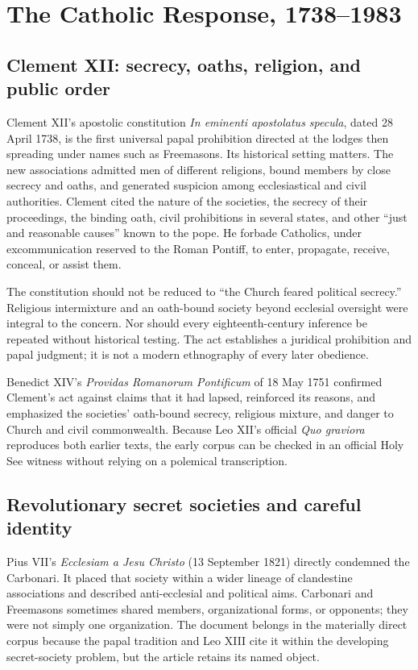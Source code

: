 \section{The Catholic Response, 1738--1983}

\subsection{Clement XII: secrecy, oaths, religion, and public order}

Clement XII's apostolic constitution \emph{In eminenti apostolatus specula}, dated 28 April 1738, is the first universal papal prohibition directed at the lodges then spreading under names such as Freemasons. Its historical setting matters. The new associations admitted men of different religions, bound members by close secrecy and oaths, and generated suspicion among ecclesiastical and civil authorities. Clement cited the nature of the societies, the secrecy of their proceedings, the binding oath, civil prohibitions in several states, and other “just and reasonable causes” known to the pope. He forbade Catholics, under excommunication reserved to the Roman Pontiff, to enter, propagate, receive, conceal, or assist them.

The constitution should not be reduced to “the Church feared political secrecy.” Religious intermixture and an oath-bound society beyond ecclesial oversight were integral to the concern. Nor should every eighteenth-century inference be repeated without historical testing. The act establishes a juridical prohibition and papal judgment; it is not a modern ethnography of every later obedience.

Benedict XIV's \emph{Providas Romanorum Pontificum} of 18 May 1751 confirmed Clement's act against claims that it had lapsed, reinforced its reasons, and emphasized the societies' oath-bound secrecy, religious mixture, and danger to Church and civil commonwealth. Because Leo XII's official \emph{Quo graviora} reproduces both earlier texts, the early corpus can be checked in an official Holy See witness without relying on a polemical transcription.

\subsection{Revolutionary secret societies and careful identity}

Pius VII's \emph{Ecclesiam a Jesu Christo} (13 September 1821) directly condemned the Carbonari. It placed that society within a wider lineage of clandestine associations and described anti-ecclesial and political aims. Carbonari and Freemasons sometimes shared members, organizational forms, or opponents; they were not simply one organization. The document belongs in the materially direct corpus because the papal tradition and Leo XIII cite it within the developing secret-society problem, but the article retains its named object.

